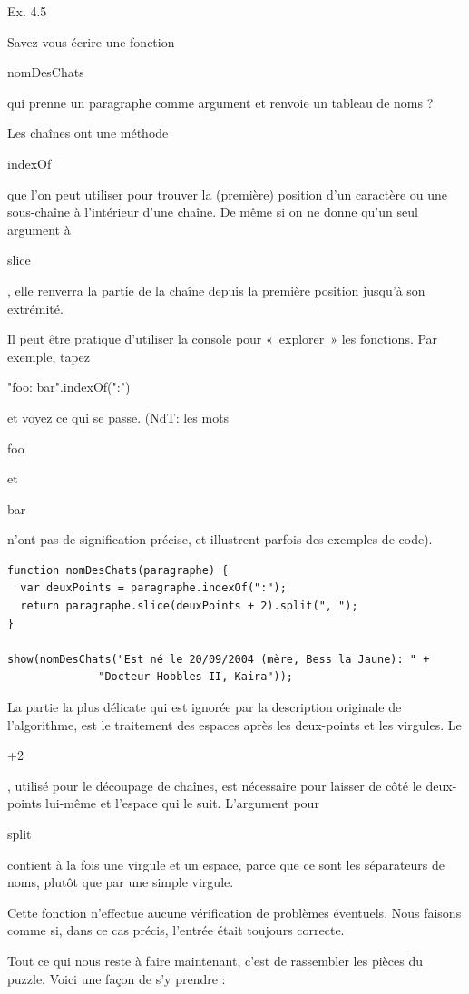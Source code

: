 \documentclass{FramateX}
\renewcommand{\texttt}[1]{\begin{sffamily}{#1}\end{sffamily}}
\begin{document}
\begin{center}\end{center}

Ex. 4.5

Savez-vous écrire une fonction \texttt{nomDesChats} qui prenne un
paragraphe comme argument et renvoie un tableau de noms ?

Les chaînes ont une méthode \texttt{indexOf}que l'on peut utiliser pour
trouver la (première) position d'un caractère ou une sous-chaîne à
l'intérieur d'une chaîne. De même si on ne donne qu'un seul argument à
\texttt{slice}, elle renverra la partie de la chaîne depuis la première
position jusqu'à son extrémité.

Il peut être pratique d'utiliser la console pour «~explorer~» les
fonctions. Par exemple, tapez \texttt{"foo: bar".indexOf(":")} et voyez
ce qui se passe. (NdT: les mots \texttt{foo} et \texttt{bar} n'ont pas
de signification précise, et illustrent parfois des exemples de code).

\begin{lstlisting}
function nomDesChats(paragraphe) {
  var deuxPoints = paragraphe.indexOf(":");
  return paragraphe.slice(deuxPoints + 2).split(", ");
}

show(nomDesChats("Est né le 20/09/2004 (mère, Bess la Jaune): " +
              "Docteur Hobbles II, Kaira"));
\end{lstlisting}
La partie la plus délicate qui est ignorée par la description originale
de l'algorithme, est le traitement des espaces après les deux-points et
les virgules. Le \texttt{+2}, utilisé pour le découpage de chaînes, est
nécessaire pour laisser de côté le deux-points lui-même et l'espace qui
le suit. L'argument pour \texttt{split} contient à la fois une virgule
et un espace, parce que ce sont les séparateurs de noms, plutôt que par
une simple virgule.

Cette fonction n'effectue aucune vérification de problèmes éventuels.
Nous faisons comme si, dans ce cas précis, l'entrée était toujours
correcte.

\begin{center}\end{center}

Tout ce qui nous reste à faire maintenant, c'est de rassembler les
pièces du puzzle. Voici une façon de s'y prendre :
\end{document}
